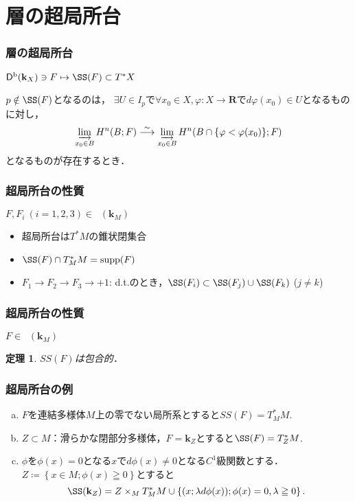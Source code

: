 \documentclass[dvipdfmx,12pt,aspectratio=169,leqno]{beamer}%
\newcommand{\rr}{\mathbf{R}}
\newcommand{\kk}{\mathbf{k}}
\numberwithin{equation}{subsection}
\newcommand{\supp}{\mathop{\mathrm{supp}}\nolimits}
\newcommand{\Dompb}{\mathop{\mathsf{D}^\mathrm{b}}\nolimits}
\newcommand{\simarr}{\mathrel{\overset{\sim}{\longrightarrow}}}%
\newcommand{\indlim}[1][]{\mathop{\varinjlim}\limits_{#1}}
\theoremstyle{mystyle}
\newtheorem{THM}[AXM]{定理}
\begin{document}
\section{層の超局所台}
\begin{frame}\frametitle{層の超局所台}
    \(\Dompb(\kk_X)\ni F\mapsto \SS(F)\subset T^{\ast}X\)
    \begin{Definition}[層の超局所台]
        \(p\notin \SS(F)\)となるのは，
        \(\exists U\in I_{p}\)で\(
            \forall x_0\in X,
            \varphi\colon X\to\rr
        \)で\(d\varphi(x_0)\in U\)となるものに対し，\[
            \indlim[x_0\in B]H^{n}(B;F)\simarr
            \indlim[x_0\in B]H^{n}(B\cap \{\varphi<\varphi(x_0)\};F)
        \]
        となるものが存在するとき．
    \end{Definition}
\end{frame}

\begin{frame}\frametitle{超局所台の性質}
    \(F, F_i~ (i=1,2,3) \in\Dompb(\kk_M)\)
    \begin{itemize}
        \item 超局所台は\(T^{\ast}M\)の錐状閉集合
        \item \(\SS(F)\cap{T^{\ast}_{M}M}=\supp(F)\)
        \item \(F_1\to F_2\to F_3\to+1\): d.t.のとき，\(\SS(F_i)\subset\SS(F_j)\cup\SS(F_k)\) (\(j\ne k\))
    \end{itemize}
\end{frame}

\begin{frame}\frametitle{超局所台の性質}
    \(F\in\Dompb(\kk_M)\)
    \begin{THM}
        \(SS(F)\)は包合的．
    \end{THM}
\end{frame}

\begin{frame}\frametitle{超局所台の例}
    \begin{enumerate}[a)]
        \item \(F\)を連結多様体\(M\)上の零でない局所系とすると\(SS(F)=T^{\ast}_{M}M\).
        \item \(Z\subset M\)：滑らかな閉部分多様体，\(F=\kk_Z\)とすると\(\SS(F)=T^{\ast}_{Z}M\).
        \item \(\phi\)を\(\phi(x)=0\)となる\(x\)で\(d\phi(x)\ne0\)となる\(C^1\)級関数とする．\(Z\coloneqq\left\{x\in M;\phi(x)\geqq0\right\}\)とすると\[
            \SS(\kk_Z)
            =Z\times_{M}T^{\ast}_{M}M
            \cup
            \left\{
                (x;\lambda d\phi(x));\phi(x)=0,\lambda\geqq0
            \right\}.
        \]
    \end{enumerate}
\end{frame}
\end{document}
